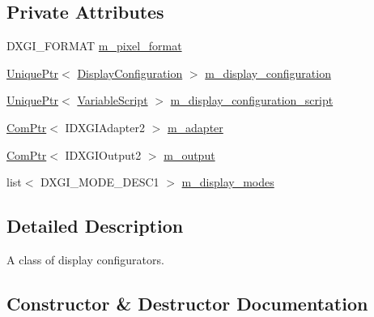 \subsection*{Private Attributes}
\begin{DoxyCompactItemize}
\item 
D\+X\+G\+I\+\_\+\+F\+O\+R\+M\+AT \hyperlink{classmage_1_1_display_configurator_a22998ef4e54c3da0118a734164792b8f}{m\+\_\+pixel\+\_\+format}
\item 
\hyperlink{namespacemage_a3316d7143a973e37adf1110f2e80ca31}{Unique\+Ptr}$<$ \hyperlink{structmage_1_1_display_configuration}{Display\+Configuration} $>$ \hyperlink{classmage_1_1_display_configurator_a5bccdf0eb57db38cf4e933ecf127488d}{m\+\_\+display\+\_\+configuration}
\item 
\hyperlink{namespacemage_a3316d7143a973e37adf1110f2e80ca31}{Unique\+Ptr}$<$ \hyperlink{classmage_1_1_variable_script}{Variable\+Script} $>$ \hyperlink{classmage_1_1_display_configurator_ab4030a5fe67b8253113799f42a0868c0}{m\+\_\+display\+\_\+configuration\+\_\+script}
\item 
\hyperlink{namespacemage_ae74f374780900893caa5555d1031fd79}{Com\+Ptr}$<$ I\+D\+X\+G\+I\+Adapter2 $>$ \hyperlink{classmage_1_1_display_configurator_a242f05283f449ba77af3d1d97607a00f}{m\+\_\+adapter}
\item 
\hyperlink{namespacemage_ae74f374780900893caa5555d1031fd79}{Com\+Ptr}$<$ I\+D\+X\+G\+I\+Output2 $>$ \hyperlink{classmage_1_1_display_configurator_a181e657b9ce888d3580c9fdbb50898e2}{m\+\_\+output}
\item 
list$<$ D\+X\+G\+I\+\_\+\+M\+O\+D\+E\+\_\+\+D\+E\+S\+C1 $>$ \hyperlink{classmage_1_1_display_configurator_af790f370efc520b3229b3327abd4236b}{m\+\_\+display\+\_\+modes}
\end{DoxyCompactItemize}


\subsection{Detailed Description}
A class of display configurators. 

\subsection{Constructor \& Destructor Documentation}
\hypertarget{classmage_1_1_display_configurator_ac6bac899c25247f90aa494eb6f0cb139}{}\label{classmage_1_1_display_configurator_ac6bac899c25247f90aa494eb6f0cb139} 
